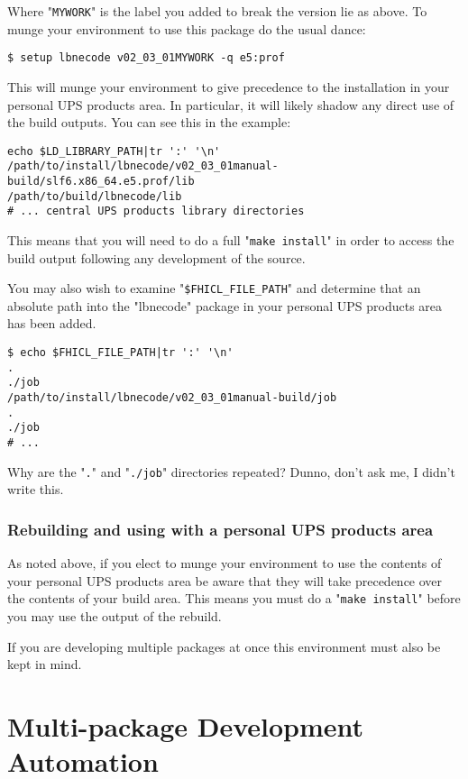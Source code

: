 \documentclass[11pt]{article}
\begin{document}
Where "\texttt{MYWORK}" is the label you added to break the version lie as above.  To munge your environment to use this package do the usual dance:

\begin{verbatim}
$ setup lbnecode v02_03_01MYWORK -q e5:prof
\end{verbatim}

This will munge your environment to give precedence to the installation in your personal UPS products area.  In particular, it will likely shadow any direct use of the build outputs.  You can see this in the example:

\begin{verbatim}
echo $LD_LIBRARY_PATH|tr ':' '\n'
/path/to/install/lbnecode/v02_03_01manual-build/slf6.x86_64.e5.prof/lib
/path/to/build/lbnecode/lib
# ... central UPS products library directories
\end{verbatim}

This means that you will need to do a full "\texttt{make install}" in order to access the build output following any development of the source.

You may also wish to examine "\texttt{\$FHICL\_FILE\_PATH}" and determine that an absolute path into the "lbnecode" package in your personal UPS products area has been added.

\begin{verbatim}
$ echo $FHICL_FILE_PATH|tr ':' '\n'
.
./job
/path/to/install/lbnecode/v02_03_01manual-build/job
.
./job
# ...
\end{verbatim}

Why are the "\texttt{.}" and "\texttt{./job}" directories repeated?  Dunno, don't ask me, I didn't write this.
\subsubsection{Rebuilding and using with a personal UPS products area}
\label{sec-1-6-2}

As noted above, if you elect to munge your environment to use the contents of your personal UPS products area be aware that they will take precedence over the contents of your build area.  This means you must do a "\texttt{make install}" before you may use the output of the rebuild. 

If you are developing multiple packages at once this environment must also be kept in mind.
\section{Multi-package Development Automation}
\label{sec-2}
\end{document}
